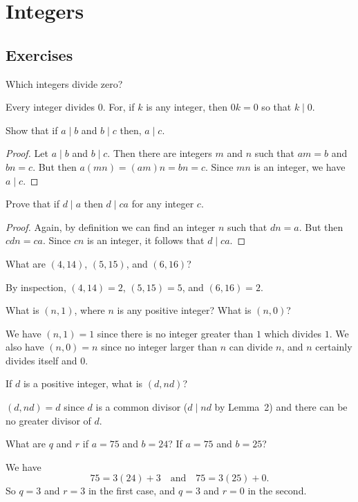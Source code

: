 \chapter{Integers}

\section{Exercises}

 Which integers divide zero?
\begin{solution}
  Every integer divides $0$. For, if $k$ is any integer, then $0k = 0$
  so that $k\mid0$.
\end{solution}

 Show that if $a\mid b$ and $b\mid c$ then, $a\mid c$.
\begin{proof}
  Let $a\mid b$ and $b\mid c$. Then there are integers $m$ and $n$
  such that $am = b$ and $bn = c$. But then $a(mn) = (am)n = bn =
  c$. Since $mn$ is an integer, we have $a\mid c$.
\end{proof}

 Prove that if $d\mid a$ then $d\mid ca$ for any integer $c$.
\begin{proof}
  Again, by definition we can find an integer $n$ such that $dn =
  a$. But then $cdn = ca$. Since $cn$ is an integer, it follows that
  $d\mid ca$.
\end{proof}

 What are $(4,14)$, $(5,15)$, and $(6,16)$?
\begin{solution}
  By inspection, $(4,14) = 2$, $(5,15) = 5$, and $(6,16) = 2$.
\end{solution}

 What is $(n,1)$, where $n$ is any positive integer? What is
$(n,0)$?
\begin{solution}
  We have $(n,1) = 1$ since there is no integer greater than $1$ which
  divides $1$. We also have $(n,0) = n$ since no integer larger than
  $n$ can divide $n$, and $n$ certainly divides itself and $0$.
\end{solution}

 If $d$ is a positive integer, what is $(d, nd)$?
\begin{solution}
  $(d,nd) = d$ since $d$ is a common divisor ($d\mid nd$ by Lemma~2)
  and there can be no greater divisor of $d$.
\end{solution}

 What are $q$ and $r$ if $a = 75$ and $b = 24$? If $a = 75$
and $b = 25$?
\begin{solution}
  We have
  \begin{equation*}
    75 = 3(24) + 3
    \quad\text{and}\quad
    75 = 3(25) + 0.
  \end{equation*}
  So $q = 3$ and $r = 3$ in the first case, and $q = 3$ and $r = 0$ in
  the second.
\end{solution}

